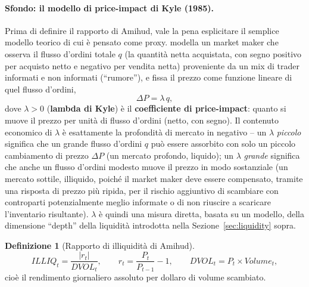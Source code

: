 \documentclass[11pt]{article}
\theoremstyle{definition}
\newtheorem{definition}[theorem]{Definizione}
\theoremstyle{remark}
\begin{document}
\paragraph{Sfondo: il modello di price-impact di Kyle (1985).} Prima di definire il rapporto di Amihud, vale la pena esplicitare il semplice modello teorico di cui \`e pensato come proxy. \cite{kyle1985continuous} modella un market maker che osserva il flusso d'ordini totale $q$ (la quantit\`a netta acquistata, con segno positivo per acquisto netto e negativo per vendita netta) proveniente da un mix di trader informati e non informati (``rumore''), e fissa il prezzo come funzione lineare di quel flusso d'ordini,
\[
\Delta P = \lambda\, q,
\]
dove $\lambda>0$ (\textbf{lambda di Kyle}) \`e il \textbf{coefficiente di price-impact}: quanto si muove il prezzo per unit\`a di flusso d'ordini (netto, con segno). Il contenuto economico di $\lambda$ \`e esattamente la profondit\`a di mercato in negativo -- un $\lambda$ \emph{piccolo} significa che un grande flusso d'ordini $q$ pu\`o essere assorbito con solo un piccolo cambiamento di prezzo $\Delta P$ (un mercato profondo, liquido); un $\lambda$ \emph{grande} significa che anche un flusso d'ordini modesto muove il prezzo in modo sostanziale (un mercato sottile, illiquido, poich\'e il market maker deve essere compensato, tramite una risposta di prezzo pi\`u ripida, per il rischio aggiuntivo di scambiare con controparti potenzialmente meglio informate o di non riuscire a scaricare l'inventario risultante). $\lambda$ \`e quindi una misura diretta, basata su un modello, della dimensione ``depth'' della liquidit\`a introdotta nella Sezione~\ref{sec:liquidity} sopra.

\begin{definition}[Rapporto di illiquidit\`a di Amihud]
\[
ILLIQ_t = \frac{|r_t|}{DVOL_t}, \qquad r_t = \frac{P_t}{P_{t-1}}-1, \qquad DVOL_t = P_t\times Volume_t,
\]
cio\`e il rendimento giornaliero assoluto per dollaro di volume scambiato.
\end{definition}
\end{document}
